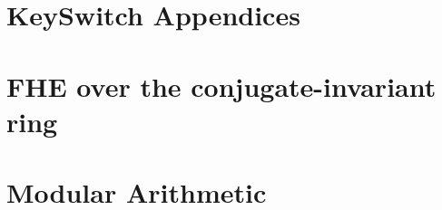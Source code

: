 \documentclass[oneside]{book}
\begin{document}
	\printbibliography 
	
	\appendix
	\renewcommand{\thechapter}{\Alph{chapter}}
	\chapter{KeySwitch Appendices}
	

        \chapter{FHE over the conjugate-invariant ring}
        

        \chapter{Modular Arithmetic}
        
\end{document}
